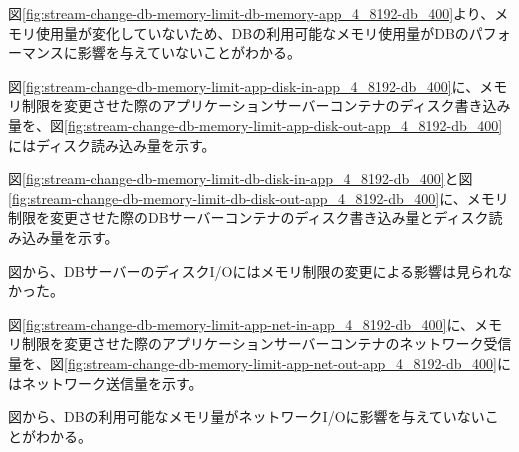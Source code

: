 \documentclass[../../../../main]{subfiles}
\begin{document}
    図\ref{fig:stream-change-db-memory-limit-db-memory-app_4_8192-db_400}より、メモリ使用量が変化していないため、DBの利用可能なメモリ使用量がDBのパフォーマンスに影響を与えていないことがわかる。


    図\ref{fig:stream-change-db-memory-limit-app-disk-in-app_4_8192-db_400}に、メモリ制限を変更させた際のアプリケーションサーバーコンテナのディスク書き込み量を、図\ref{fig:stream-change-db-memory-limit-app-disk-out-app_4_8192-db_400}にはディスク読み込み量を示す。

    
    

    図\ref{fig:stream-change-db-memory-limit-db-disk-in-app_4_8192-db_400}と図\ref{fig:stream-change-db-memory-limit-db-disk-out-app_4_8192-db_400}に、メモリ制限を変更させた際のDBサーバーコンテナのディスク書き込み量とディスク読み込み量を示す。

    
    

    図から、DBサーバーのディスクI/Oにはメモリ制限の変更による影響は見られなかった。


    図\ref{fig:stream-change-db-memory-limit-app-net-in-app_4_8192-db_400}に、メモリ制限を変更させた際のアプリケーションサーバーコンテナのネットワーク受信量を、図\ref{fig:stream-change-db-memory-limit-app-net-out-app_4_8192-db_400}にはネットワーク送信量を示す。

    
    

    図から、DBの利用可能なメモリ量がネットワークI/Oに影響を与えていないことがわかる。
\end{document}
